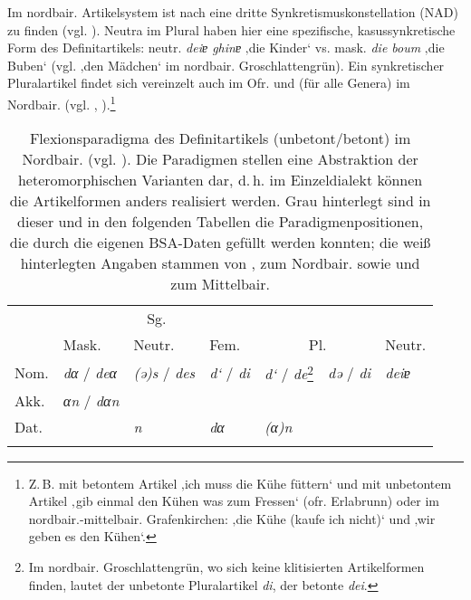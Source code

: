 Im nordbair. Artikelsystem ist nach \citet[428]{Rowley1990b} eine dritte Synkretismuskonstellation (NAD) zu finden (vgl. ). Neutra im Plural haben hier eine spezifische, kasussynkretische Form des Definitartikels: neutr. \textit{deiɐ ghinɐ} ‚die Kinder‘ vs. mask. \textit{die boum} ‚die Buben‘ (vgl.   ‚den Mädchen‘ im nordbair. Groschlattengrün). Ein synkretischer Pluralartikel findet sich vereinzelt auch im Ofr. und (für alle Genera) im Nordbair. (vgl. \citealt[347]{Rowley2004}, \citealt[436]{SMF7}).\footnote{Z.\,B. mit betontem Artikel      ‚ich muss die Kühe füttern‘ und mit unbetontem Artikel        ‚gib einmal den Kühen was zum Fressen‘ (ofr. Erlabrunn) oder im nordbair.-mittelbair. Grafenkirchen:   ‚die Kühe (kaufe ich nicht)‘ und     ‚wir geben es den Kühen‘.}


\begin{table}[p]
\begin{tabular}{lllllll}
\lsptoprule
& \multicolumn{3}{c}{{Sg.}} & \\
 & {Mask.} & {Neutr.} & {Fem.} & \multicolumn{2}{c}{{Pl.}} & \multicolumn{1}{l}{{Neutr.}}\\\cmidrule(lr){2-4}\cmidrule(lr){5-6}\cmidrule(lr){7-7}
{Nom.} & \cellcolor{lsLightGray}\textit{dα} / \textit{deα} & \cellcolor{lsLightGray}\textit{(ə)s} / \textit{des} & \cellcolor{lsLightGray}\textit{d‘} / \textit{di} & \cellcolor{lsLightGray}\textit{d‘} / \textit{de}\footnote{Im nordbair. Groschlattengrün, wo sich keine klitisierten Artikelformen finden, lautet der unbetonte Pluralartikel \textit{di}, der betonte \textit{dei}.} & \cellcolor{lsLightGray}\textit{də} / \textit{di} & \textit{deiɐ}\\
{Akk.} & \cellcolor{lsLightGray}\textit{αn} / \textit{dαn} & \cellcolor{lsLightGray} & \cellcolor{lsLightGray} & \cellcolor{lsLightGray} & \cellcolor{lsLightGray} & \\
{Dat.} & \cellcolor{lsLightGray} & \textit{n} & \cellcolor{lsLightGray}\textit{dα} & \cellcolor{lsLightGray}\textit{(α)n} & \cellcolor{lsLightGray} & \\
\lspbottomrule
\end{tabular}
\caption{Flexionsparadigma des Definitartikels (unbetont\slash betont) im Nordbair. (vgl. \citealt[427]{Rowley1990b}). Die Paradigmen stellen eine Abstraktion der heteromorphischen Varianten dar, d.\,h. im Einzeldialekt können die Artikelformen anders realisiert werden. Grau hinterlegt sind in dieser und in den folgenden Tabellen die Paradigmenpositionen, die durch die eigenen BSA-Daten gefüllt werden konnten; die weiß hinterlegten Angaben stammen von \citet[403]{Rowley1990a}, \citet[427]{Rowley1990b} zum Nordbair. sowie \citet[316]{Eroms1989} und \citet[237]{Scheutz1988} zum Mittelbair.\label{tab:40}}
\end{table}

